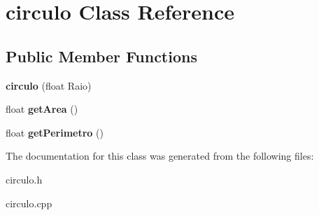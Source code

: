 \hypertarget{classcirculo}{}\section{circulo Class Reference}
\label{classcirculo}
\subsection*{Public Member Functions}
\begin{DoxyCompactItemize}
\item 
\mbox{\label{classcirculo_adb9dc9e9ad1c10bc0d2f69d08d04339b}} 
{\bfseries circulo} (float Raio)
\item 
\mbox{\label{classcirculo_a3c137b5efd621252e95c1db378eb2cd6}} 
float {\bfseries get\+Area} ()
\item 
\mbox{\label{classcirculo_aa8547bc9d38318b6c5ba40160514d0d5}} 
float {\bfseries get\+Perimetro} ()
\end{DoxyCompactItemize}


The documentation for this class was generated from the following files\+:\begin{DoxyCompactItemize}
\item 
circulo.\+h\item 
circulo.\+cpp\end{DoxyCompactItemize}
